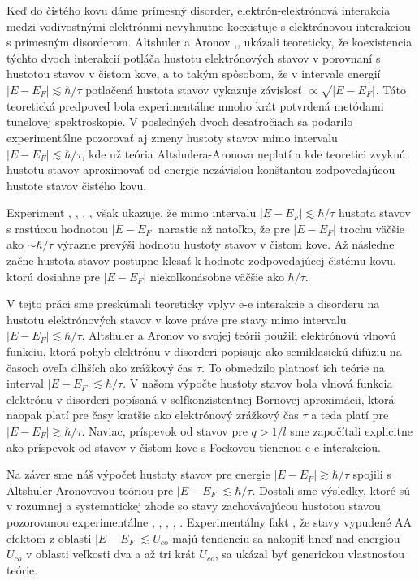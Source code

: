 
Keď do čistého kovu dáme prímesný disorder, elektrón-elektrónová interakcia medzi vodivostnými elektrónmi nevyhnutne koexistuje s elektrónovou interakciou s prímesným disorderom. Altshuler a Aronov \cite{Altshuler1},\cite{Altshuler3},\cite{Altshuler4} ukázali teoreticky, že koexistencia týchto
dvoch interakcií potláča hustotu elektrónových stavov v porovnaní s hustotou stavov v čistom kove, a to takým spôsobom, že v intervale energií $|E-E_F| \lesssim \hbar/\tau$ potlačená hustota stavov vykazuje závislosť $\propto \sqrt{|E-E_F|}$. Táto teoretická predpoveď bola experimentálne mnoho krát potvrdená metódami tunelovej
spektroskopie. V posledných dvoch desaťročiach sa podarilo experimentálne pozorovať aj zmeny hustoty stavov mimo intervalu $|E-E_F| \lesssim \hbar/\tau$, kde už teória Altshulera-Aronova neplatí a kde teoretici zvyknú hustotu stavov aproximovať od energie nezávislou konštantou zodpovedajúcou hustote stavov čistého kovu.

 Experiment \cite{Mazur}, \cite{Schmitz1}, \cite{Schmitz2}, \cite{Escudero}, \cite{Moskova} však ukazuje, že mimo intervalu $|E-E_F| \lesssim \hbar/\tau$ hustota stavov s rastúcou hodnotou $|E-E_F|$ narastie až natoľko, že pre $|E-E_F| $ trochu väčšie ako $\sim \hbar/\tau$ výrazne prevýši hodnotu hustoty stavov v čistom kove. Až následne začne hustota stavov postupne klesať k hodnote zodpovedajúcej čistému kovu, ktorú dosiahne pre $|E-E_F|$ niekoľkonásobne väčšie ako $\hbar/\tau$.

V tejto práci sme preskúmali teoreticky vplyv e-e interakcie a disorderu na
hustotu elektrónových stavov v kove práve pre stavy mimo intervalu $|E-E_F| \lesssim \hbar/\tau$. Altshuler a Aronov vo svojej teórii použili elektrónovú vlnovú funkciu, ktorá pohyb elektrónu v disorderi popisuje ako semiklasickú difúziu na časoch oveľa dlhších ako zrážkový čas $\tau$. To obmedzilo platnosť ich teórie na interval $|E-E_F| \lesssim \hbar/\tau$. V našom výpočte hustoty stavov bola vlnová funkcia elektrónu v disorderi popísaná v selfkonzistentnej Bornovej aproximácii, ktorá naopak platí pre časy kratšie ako elektrónový zrážkový čas $\tau$ a teda platí pre $|E-E_F| \gtrsim \hbar/\tau$. Naviac, príspevok od stavov pre $q > 1/l$  sme započítali explicitne ako príspevok od stavov v čistom kove s Fockovou tienenou e-e interakciou.



  Na záver sme náš výpočet hustoty stavov pre energie $|E-E_F|  \gtrsim \hbar/\tau$ spojili s Altshuler-Aronovovou teóriou pre $|E-E_F|  \lesssim \hbar/\tau$. Dostali sme výsledky, ktoré sú v rozumnej a systematickej zhode so stavy zachovávajúcou hustotou stavou pozorovanou experimentálne \cite{Mazur}, \cite{Schmitz1}, \cite{Schmitz2}, \cite{Escudero}, \cite{Moskova}. Experimentálny fakt \cite{Mazur}, že stavy vypudené AA efektom z oblasti $|E-E_F| \lesssim U_{co}$ majú tendenciu sa nakopiť hneď nad energiou $U_{co}$ v oblasti veľkosti dva a až tri krát $U_{co}$, sa ukázal byť generickou vlastnosťou teórie.

